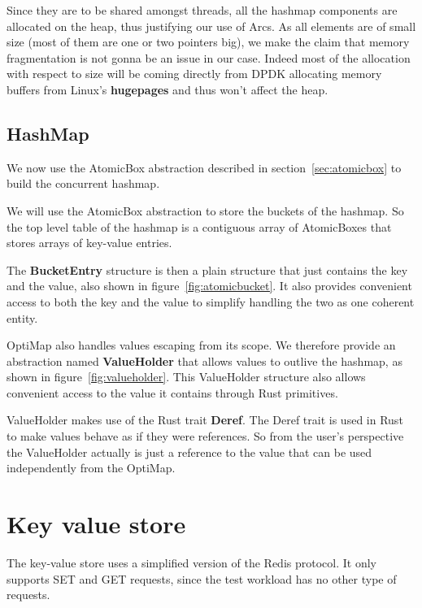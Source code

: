Since they are to be shared amongst threads, all the hashmap
components are allocated on the heap, thus justifying our use of
Arcs. As all elements are of small size (most of them are one or two
pointers big), we make the claim that memory fragmentation is not
gonna be an issue in our case. Indeed most of the allocation with
respect to size will be coming directly from DPDK allocating memory
buffers from Linux's \textbf{hugepages} and thus won't affect the
heap.

\subsection{HashMap}

We now use the AtomicBox abstraction described in
section~\ref{sec:atomicbox} to build the concurrent hashmap.

We will use the AtomicBox abstraction to store the buckets of the
hashmap. So the top level table of the hashmap is a contiguous array
of AtomicBoxes that stores arrays of key-value entries.



The \textbf{BucketEntry} structure is then a plain structure that just
contains the key and the value, also shown in
figure~\ref{fig:atomicbucket}. It also provides convenient access to
both the key and the value to simplify handling the two as one
coherent entity.

OptiMap also handles values escaping from its scope. We therefore
provide an abstraction named \textbf{ValueHolder} that allows values to
outlive the hashmap, as shown in figure~\ref{fig:valueholder}. This
ValueHolder structure also allows convenient access to the value it
contains through Rust primitives.



ValueHolder makes use of the Rust trait \textbf{Deref}. The Deref
trait is used in Rust to make values behave as if they were
references. So from the user's perspective the ValueHolder actually is
just a reference to the value that can be used independently from the
OptiMap.

\section{Key value store}

The key-value store uses a simplified version of the Redis
protocol. It only supports SET and GET requests, since the test
workload has no other type of requests.

